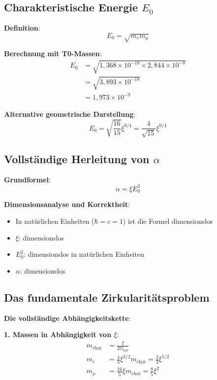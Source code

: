 \documentclass[12pt,a4paper]{article}
\newcommand{\xipar}{\xi}
\newcommand{\alphagem}{\alpha}
\newcommand{\mchar}{m_{\text{char}}}
\newcommand{\Ezero}{E_0}
\begin{document}
	\subsection{Charakteristische Energie $\Ezero$}
	
	\textbf{Definition}:
	\begin{equation}
		\Ezero = \sqrt{m_e m_\mu}
	\end{equation}
	
	\textbf{Berechnung mit T0-Massen}:
	\begin{align}
		\Ezero &= \sqrt{1{,}368 \times 10^{-10} \times 2{,}844 \times 10^{-8}} \\
		&= \sqrt{3{,}893 \times 10^{-18}} \\
		&= 1{,}973 \times 10^{-9}
	\end{align}
	
	\textbf{Alternative geometrische Darstellung}:
	\begin{equation}
		\Ezero = \sqrt{\frac{16}{15}} \xipar^{9/4} = \frac{4}{\sqrt{15}} \xipar^{9/4}
	\end{equation}
	
	\subsection{Vollständige Herleitung von $\alphagem$}
	
	\textbf{Grundformel}:
	\begin{equation}
		\alphagem = \xipar \Ezero^2
	\end{equation}
	
	\textbf{Dimensionsanalyse und Korrektheit}:
	\begin{itemize}
		\item In natürlichen Einheiten ($\hbar = c = 1$) ist die Formel dimensionslos
		\item $\xipar$: dimensionslos
		\item $\Ezero^2$: dimensionslos in natürlichen Einheiten
		\item $\alphagem$: dimensionslos
	\end{itemize}
	
	\subsection{Das fundamentale Zirkularitätsproblem}
	
	\textbf{Die vollständige Abhängigkeitskette}:
	
	\textbf{1. Massen in Abhängigkeit von $\xipar$}:
	\begin{align}
		\mchar &= \frac{\xipar}{2G_{\text{nat}}} \\
		m_e &= \frac{4}{3} \xipar^{3/2} \mchar = \frac{2}{3} \xipar^{5/2} \\
		m_\mu &= \frac{16}{5} \xipar \mchar = \frac{8}{5} \xipar^2
	\end{align}
	
\end{document}
